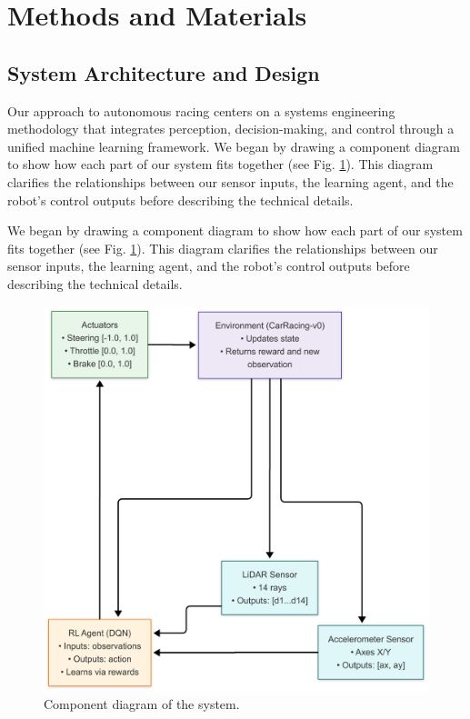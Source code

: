 \section{Methods and Materials}

\subsection{System Architecture and Design}

Our approach to autonomous racing centers on a systems engineering methodology that integrates perception, decision-making, and control through a unified machine learning framework. We began by drawing a component diagram to show how each part of our system fits together (see Fig. \ref{fig:component_diagram}). This diagram clarifies the relationships between our sensor inputs, the learning agent, and the robot's control outputs before describing the technical details.


We began by drawing a component diagram to show how each part of our system fits together (see Fig. \ref{fig:component_diagram}). This diagram clarifies the relationships between our sensor inputs, the learning agent, and the robot’s control outputs before describing the technical details.

\begin{figure}[h]
    \centering
    \includegraphics[width=0.8\linewidth]{images/ComponentDiagram.png}
    \caption{Component diagram of the system.}
    \label{fig:component_diagram}
\end{figure}

